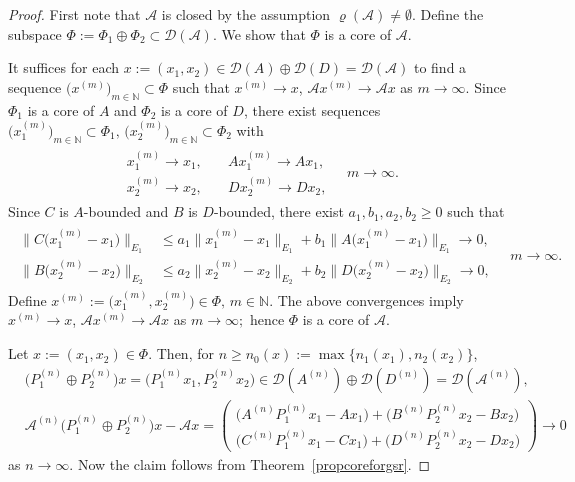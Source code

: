 \documentclass[a4paper,reqno]{amsart}
\begin{document}
\begin{proof}
First note that ${\mathcal A}$ is closed by the assumption $\varrho({\mathcal A})\neq\emptyset$.
Define the subspace $\Phi:=\Phi_1\oplus\Phi_2\subset{\mathcal D}({\mathcal A})$. We show that $\Phi$ is a core of ${\mathcal A}$.

It suffices for each $x:=(x_1,x_2)\in{\mathcal D}(A)\oplus{\mathcal D}(D)={\mathcal D}({\mathcal A})$ to find a sequence $\big(x^{(m)}\big)_{m\in{\mathbb{N}}}\subset\Phi$ such that $x^{(m)}\to x$, ${\mathcal A} x^{(m)}\to{\mathcal A} x$ as $m\to\infty$.
Since $\Phi_1$ is a core of $A$ and $\Phi_2$ is a core of $D$, there exist sequences
 $\big(x_1^{(m)}\big)_{m\in{\mathbb{N}}}\subset\Phi_1, \,\big(x_2^{(m)}\big)_{m\in{\mathbb{N}}}\subset\Phi_2$ with 
\begin{align*}
\begin{array}{ll} 
x_1^{(m)}{\longrightarrow} x_1, \quad &Ax_1^{(m)}{\longrightarrow} Ax_1, \\[2mm]
 x_2^{(m)}{\longrightarrow} x_2, \quad &Dx_2^{(m)}{\longrightarrow} Dx_2, 
\end{array}
\quad m\to\infty.
\end{align*}
Since $C$ is $A$-bounded and $B$ is $D$-bounded, there exist $a_1, b_1, a_2, b_2\geq 0$ such that
\begin{align*}
\begin{array}{ll} 
\big\|C\big(x_1^{(m)}-x_1\big)\big\|_{E_1} &\leq a_1\big\|x_1^{(m)}-x_1\big\|_{E_1}+b_1\big\|A\big(x_1^{(m)}-x_1\big)\big\|_{E_1}{\longrightarrow} 0,\\[2mm]
\big\|B\big(x_2^{(m)}-x_2\big)\big\|_{E_2} &\leq a_2\big\|x_2^{(m)}-x_2\big\|_{E_2}+b_2\big\|D\big(x_2^{(m)}-x_2\big)\big\|_{E_2}{\longrightarrow} 0, 
\end{array}
\quad m\to\infty.
\end{align*}
Define $x^{(m)}:=\big(x_1^{(m)},x_2^{(m)}\big)\in\Phi, \,m\in{\mathbb{N}}$. The above convergences imply 
$x^{(m)}\to x$, ${\mathcal A} x^{(m)}\to{\mathcal A} x$ as $m\to\infty;$
hence $\Phi$ is a core of ${\mathcal A}$.

Let $x:=(x_1,x_2)\in\Phi$. Then, for  $n\geq n_0(x):=\max\{n_1(x_1),n_2(x_2)\}$,
\begin{align*}
&\big(P_1^{(n)}\oplus P_2^{(n)}\big)x=\big(P_1^{(n)}x_1,P_2^{(n)}x_2\big)\in{\mathcal D}(A^{(n)})\oplus{\mathcal D}(D^{(n)})={\mathcal D}({\mathcal A}^{(n)}), \\
&{\mathcal A}^{(n)}\big(P_1^{(n)}\oplus P_2^{(n)}\big)x- {\mathcal A} x=\begin{pmatrix} \big(A^{(n)}P_1^{(n)}x_1-Ax_1\big) + \big(B^{(n)}P_2^{(n)}x_2-Bx_2\big)\\ \big(C^{(n)}P_1^{(n)}x_1-Cx_1\big)+ \big(D^{(n)}P_2^{(n)}x_2-Dx_2\big)\end{pmatrix}{\longrightarrow} 0
\end{align*}
as $n\to\infty$. Now the claim follows from Theorem~\ref{propcoreforgsr}.
\end{proof}
\end{document}
